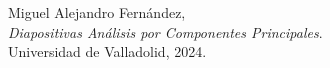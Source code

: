 \documentclass{article}
\begin{document}
\newpage


\begin{thebibliography}{9}
    Miguel Alejandro Fernández, \\ \textit{Diapositivas Análisis por Componentes Principales}. \\ Universidad de Valladolid, 2024.
\end{thebibliography}

% 
% 

\end{document}

